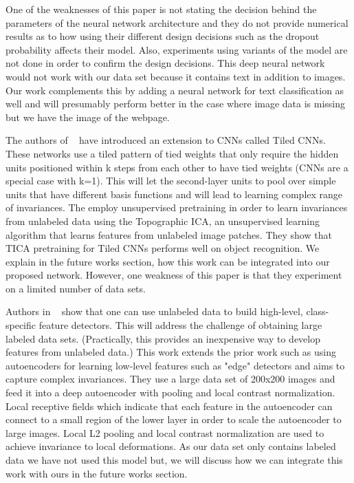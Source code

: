 \documentclass{article} %
\begin{document}
One of the weaknesses of this paper is not stating the decision behind the parameters of the neural network architecture and they do not provide numerical results as to how using their different design decisions such as the dropout probability affects their model. Also, experiments using variants of the model are not done in order to confirm the design decisions. This deep neural network would not work with our data set because it contains text in addition to images. Our work complements this by adding a neural network for text classification as well and will presumably perform better in the case where image data is missing but we have the image of the webpage.

The authors of ~\cite{nipsandrewng} have introduced an extension to CNNs called Tiled CNNs. These networks use a tiled pattern of tied weights that only require the hidden units positioned within k steps from each other to have tied weights (CNNs are a special case with k=1). This will let the second-layer units to pool over simple units that have different basis functions and will lead to learning complex range of invariances. The employ unsupervised pretraining in order to learn invariances from unlabeled data using the Topographic ICA, an unsupervised learning algorithm that learns features from unlabeled image patches. They show that TICA pretraining for Tiled CNNs performs well on object recognition. We explain in the future works section, how this work can be integrated into our proposed network. However, one weakness of this paper is that they experiment on a limited number of data sets.

Authors in ~\cite{icml_unsupervised} show that one can use unlabeled data to build high-level, class-specific feature detectors. This will address the challenge of obtaining large labeled data sets. (Practically, this provides an inexpensive way to develop features from unlabeled data.) This work extends the prior work such as using autoencoders for learning low-level features such as "edge" detectors and aims to capture complex invariances. They use a large data set of 200x200 images and feed it into a deep autoencoder with pooling and local contrast normalization. Local receptive fields which indicate that each feature in the autoencoder can connect to a small region of the lower layer in order to scale the autoencoder to large images. Local L2 pooling and local contrast normalization are used to achieve invariance to local deformations. As our data set only contains labeled data we have not used this model but, we will discuss how we can integrate this work with ours in the future works section.
\end{document}
